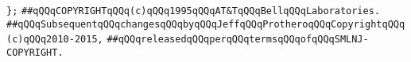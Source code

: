 \verb|};|\newline
\newline
\newline
\newline
\verb|##qQQqCOPYRIGHTqQQq(c)qQQq1995qQQqAT&TqQQqBellqQQqLaboratories.|\newline
\verb|##qQQqSubsequentqQQqchangesqQQqbyqQQqJeffqQQqProtheroqQQqCopyrightqQQq(c)qQQq2010-2015,|\newline
\verb|##qQQqreleasedqQQqperqQQqtermsqQQqofqQQqSMLNJ-COPYRIGHT.|\newline

